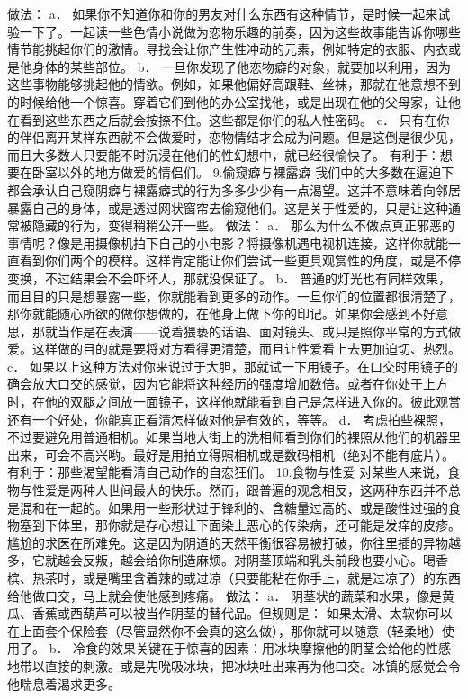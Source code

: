 \documentclass[12pt,UTF8]{ctexbook}
\begin{document}
做法：
a． 如果你不知道你和你的男友对什么东西有这种情节，是时候一起来试验一下了。一起读一些色情小说做为恋物乐趣的前奏，因为这些故事能告诉你哪些情节能挑起你们的激情。寻找会让你产生性冲动的元素，例如特定的衣服、内衣或是他身体的某些部位。
b． 一旦你发现了他恋物癖的对象，就要加以利用，因为这些事物能够挑起他的情欲。例如，如果他偏好高跟鞋、丝袜，那就在他意想不到的时候给他一个惊喜。穿着它们到他的办公室找他，或是出现在他的父母家，让他在看到这些东西之后就会按捺不住。这些都是你们的私人性密码。
c． 只有在你的伴侣离开某样东西就不会做爱时，恋物情结才会成为问题。但是这倒是很少见，而且大多数人只要能不时沉浸在他们的性幻想中，就已经很愉快了。
有利于：想要在卧室以外的地方做爱的情侣们。
9.偷窥癖与裸露癖
我们中的大多数在逼迫下都会承认自己窥阴癖与裸露癖式的行为多多少少有一点渴望。这并不意味着向邻居暴露自己的身体，或是透过网状窗帘去偷窥他们。这是关于性爱的，只是让这种通常被隐藏的行为，变得稍稍公开一些。
做法：
a． 那么为什么不做点真正邪恶的事情呢？像是用摄像机拍下自己的小电影？将摄像机遇电视机连接，这样你就能一直看到你们两个的模样。这样肯定能让你们尝试一些更具观赏性的角度，或是不停变换，不过结果会不会吓坏人，那就没保证了。
b． 普通的灯光也有同样效果，而且目的只是想暴露一些，你就能看到更多的动作。一旦你们的位置都很清楚了，那你就能随心所欲的做你想做的，在他身上做下你的印记。如果你会感到不好意思，那就当作是在表演——说着猥亵的话语、面对镜头、或只是照你平常的方式做爱。这样做的目的就是要将对方看得更清楚，而且让性爱看上去更加迫切、热烈。
c． 如果以上这种方法对你来说过于大胆，那就试一下用镜子。在口交时用镜子的确会放大口交的感觉，因为它能将这种经历的强度增加数倍。或者在你处于上方时，在他的双腿之间放一面镜子，这样他就能看到自己是怎样进入你的。彼此观赏还有一个好处，你能真正看清怎样做对他是有效的，等等。
d． 考虑拍些裸照，不过要避免用普通相机。如果当地大街上的洗相师看到你们的裸照从他们的机器里出来，可会不高兴哟。最好是用拍立得照相机或是数码相机（绝对不能有底片）。
有利于：那些渴望能看清自己动作的自恋狂们。
10.食物与性爱
对某些人来说，食物与性爱是两种人世间最大的快乐。然而，跟普遍的观念相反，这两种东西并不总是混和在一起的。如果用一些形状过于锋利的、含糖量过高的、或是酸性过强的食物塞到下体里，那你就是存心想让下面染上恶心的传染病，还可能是发痒的皮疹。尴尬的求医在所难免。这是因为阴道的天然平衡很容易被打破，你往里插的异物越多，它就越会反叛，越会给你制造麻烦。对阴茎顶端和乳头前段也要小心。喝香槟、热茶时，或是嘴里含着辣的或过凉（只要能粘在你手上，就是过凉了）的东西给他做口交，马上就会使他感到疼痛。
做法：
a． 阴茎状的蔬菜和水果，像是黄瓜、香蕉或西葫芦可以被当作阴茎的替代品。但规则是： 如果太滑、太软你可以在上面套个保险套（尽管显然你不会真的这么做），那你就可以随意（轻柔地）使用了。
b． 冷食的效果关键在于惊喜的因素：用冰块摩擦他的阴茎会给他的性感地带以直接的刺激。或是先吮吸冰块，把冰块吐出来再为他口交。冰镇的感觉会令他喘息着渴求更多。
\end{document}
